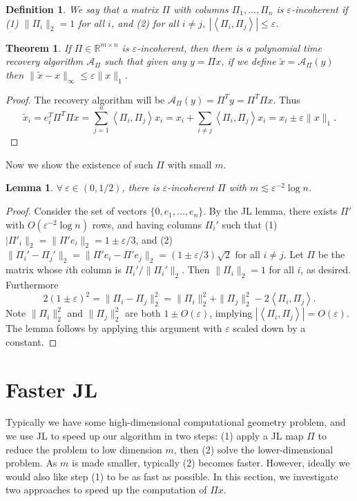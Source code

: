 \documentclass[12pt]{article}
\newcommand{\eps}{\varepsilon}
\newcommand{\inprod}[1]{\left\langle #1 \right\rangle}
\newcommand{\R}{\mathbb{R}}
\newtheorem{theorem}{Theorem}
\newtheorem{definition}{Definition}
\newtheorem{lemma}{Lemma}
\begin{document}
\begin{definition}
We say that a matrix $\Pi$ with columns $\Pi_1,\ldots,\Pi_n$ is {\em $\eps$-incoherent} if (1) $\|\Pi_i\|_2 = 1$ for all $i$, and (2) for all $i\neq j$, $|\inprod{\Pi_i, \Pi_j}| \le \eps$.
\end{definition}

\begin{theorem}
If $\Pi\in\R^{m\times n}$ is $\eps$-incoherent, then there is a polynomial time recovery algorithm $\mathcal{A}_\Pi$ such that given any $y = \Pi x$, if we define $\tilde{x} = \mathcal{A}_\Pi(y)$ then $\|\tilde{x} - x\|_\infty \le \eps\|x\|_1$.
\end{theorem}
\begin{proof}
The recovery algorithm will be $\mathcal{A}_\Pi(y) = \Pi^T y = \Pi^T \Pi x$. Thus
$$
\tilde{x}_i = e_i^T \Pi^T \Pi x = \sum_{j=1}^n \inprod{\Pi_i, \Pi_j} x_i = x_i + \sum_{i\neq j} \inprod{\Pi_i, \Pi_j} x_i = x_i \pm \eps\|x\|_1 .
$$
\end{proof}

Now we show the existence of such $\Pi$ with small $m$.

\begin{lemma}
$\forall\ \eps\in(0,1/2)$, there is $\eps$-incoherent $\Pi$ with $m \lesssim \eps^{-2}\log n$.
\end{lemma}
\begin{proof}
Consider the set of vectors $\{0,e_1,\ldots,e_n\}$. By the JL lemma, there exists $\Pi'$ with $O(\eps^{-2}\log n)$ rows, and having columns $\Pi_i'$ such that (1) $|\Pi'_i\|_2 = \|\Pi' e_i\|_2 = 1\pm \eps/3$, and (2) $\|\Pi_i' - \Pi_j'\|_2 = \|\Pi' e_i - \Pi'e_j\|_2 = (1\pm\eps/3)\sqrt{2}$ for all $i\neq j$. Let $\Pi$ be the matrix whose $i$th column is $\Pi_i'/\|\Pi_i'\|_2$. Then $\|\Pi_i\|_2 = 1$ for all $i$, as desired. Furthermore
$$
2(1\pm\eps)^2 = \|\Pi_i - \Pi_j\|_2^2 = \|\Pi_i\|_2^2 + \|\Pi_j\|_2^2 - 2\inprod{\Pi_i, \Pi_j} .
$$
Note $\|\Pi_i\|_2^2$ and $\|\Pi_j\|_2^2$ are both $1\pm O(\eps)$, implying $|\inprod{\Pi_i, \Pi_j}| = O(\eps)$. The lemma follows by applying this argument with $\eps$ scaled down by a constant.
\end{proof}

\section{Faster JL}

Typically we have some high-dimensional computational geometry problem, and we use JL to speed up our algorithm in two steps: (1) apply a JL map $\Pi$ to reduce the problem to low dimension $m$, then (2) solve the lower-dimensional problem. As $m$ is made smaller, typically (2) becomes faster. However, ideally we would also like step (1) to be as fast as possible. In this section, we investigate two approaches to speed up the computation of $\Pi x$.
\end{document}

